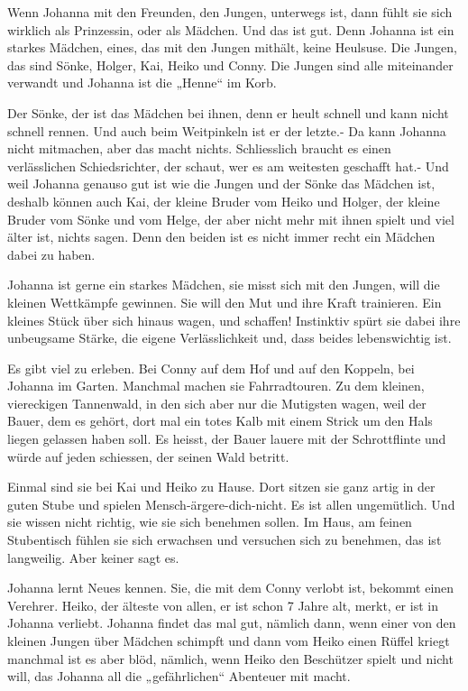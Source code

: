 \documentclass[10pt,titlepage,a5paper]{book}
\begin{document}
Wenn Johanna mit den Freunden, den Jungen, unterwegs ist, dann fühlt sie sich wirklich als Prinzessin, oder als Mädchen. Und das ist gut. Denn Johanna ist ein starkes Mädchen, eines, das mit den Jungen mithält, keine Heulsuse. Die Jungen, das sind Sönke, Holger, Kai, Heiko und Conny.
Die Jungen sind alle miteinander verwandt und Johanna ist die „Henne“ im Korb. 

Der Sönke, der ist das Mädchen bei ihnen, denn er heult schnell und kann nicht schnell rennen. Und auch beim Weitpinkeln ist er der letzte.- Da kann Johanna nicht mitmachen, aber das macht nichts. Schliesslich braucht es einen verlässlichen Schiedsrichter, der schaut, wer es am weitesten geschafft hat.- Und weil Johanna genauso gut ist wie die Jungen und der Sönke das Mädchen ist, deshalb können auch Kai, der kleine Bruder vom Heiko und Holger, der kleine Bruder vom Sönke und vom Helge, der aber nicht mehr mit ihnen spielt und viel älter ist, nichts sagen. Denn den beiden ist es nicht immer recht ein Mädchen dabei zu haben.

Johanna ist gerne ein starkes Mädchen, sie misst sich mit den Jungen, will die kleinen Wettkämpfe gewinnen. Sie will den Mut und ihre Kraft trainieren. Ein kleines Stück über sich hinaus wagen, und schaffen! Instinktiv spürt sie dabei ihre unbeugsame Stärke, die eigene Verlässlichkeit und, dass beides lebenswichtig ist.

Es gibt viel zu erleben. Bei Conny auf dem Hof und auf den Koppeln, bei Johanna im Garten. Manchmal machen sie Fahrradtouren. Zu dem kleinen, viereckigen Tannenwald, in den sich aber nur die Mutigsten wagen, weil der Bauer, dem es gehört, dort mal ein totes Kalb mit einem Strick um den Hals liegen gelassen haben soll. Es heisst, der Bauer lauere mit der Schrottflinte und würde auf jeden schiessen, der seinen Wald betritt.

Einmal sind sie bei Kai und Heiko zu Hause. Dort sitzen sie ganz artig in der guten Stube und spielen Mensch-ärgere-dich-nicht. Es ist allen ungemütlich. Und sie wissen nicht richtig, wie sie sich benehmen sollen. Im Haus, am feinen Stubentisch fühlen sie sich erwachsen und versuchen sich zu benehmen, das ist langweilig. Aber keiner sagt es. 

Johanna lernt Neues kennen. Sie, die mit dem Conny verlobt ist, bekommt einen Verehrer. Heiko, der älteste von allen, er ist schon 7 Jahre alt, merkt, er ist in Johanna verliebt. Johanna findet das mal gut, nämlich dann, wenn einer von den kleinen Jungen über Mädchen schimpft und dann vom Heiko einen Rüffel kriegt manchmal ist es aber blöd, nämlich, wenn Heiko den Beschützer spielt und nicht will, das Johanna all die „gefährlichen“ Abenteuer mit macht.
\end{document}
